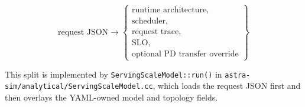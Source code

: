 \begin{equation*}
\text{request JSON} \rightarrow
\left\{
\begin{array}{l}
\text{runtime architecture}, \\
\text{scheduler}, \\
\text{request trace}, \\
\text{SLO}, \\
\text{optional PD transfer override}
\end{array}
\right\}
\end{equation*}

This split is implemented by \texttt{ServingScaleModel::run()} in
\texttt{astra-sim/analytical/ServingScaleModel.cc}, which loads the request JSON
first and then overlays the YAML-owned model and topology fields.
